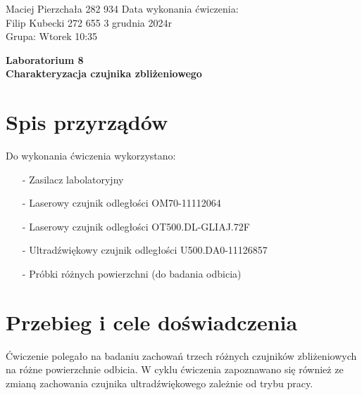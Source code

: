 \documentclass[11pt]{article}
\begin{document}
    \begin{flushleft}
        Maciej Pierzchała 282 934 \hfill Data wykonania ćwiczenia:\\
        Filip Kubecki 272 655 \hfill 3 grudnia 2024r\\
        Grupa: Wtorek 10:35 \\
    \end{flushleft}
    \vspace{1cm}
    \begin{center}
        \Large\textbf{Laboratorium 8}\\
        \textbf{Charakteryzacja czujnika zbliżeniowego}
    \end{center}
    \hfill
    \vspace{4cm}
    \section{Spis przyrządów}
    \par{
        Do wykonania ćwiczenia wykorzystano:
        \begin{itemize}
            \setlength\itemsep{0em}
            \item[-] Zasilacz labolatoryjny
            \item[-] Laserowy czujnik odległości OM70-11112064
            \item[-] Laserowy czujnik odległości OT500.DL-GLIAJ.72F
            \item[-] Ultradźwiękowy czujnik odległości U500.DA0-11126857
            \item[-] Próbki różnych powierzchni (do badania odbicia)
        \end{itemize}
    }
    \section{Przebieg i cele doświadczenia}
    \par Ćwiczenie polegało na badaniu zachowań trzech różnych czujników zbliżeniowych na różne powierzchnie odbicia.
    W cyklu ćwiczenia zapoznawano się również ze zmianą zachowania czujnika ultradźwiękowego zależnie od trybu pracy.\\
\end{document}
